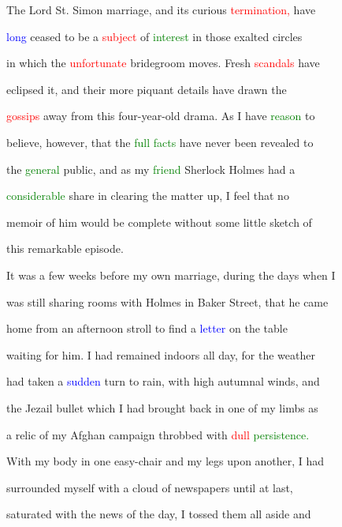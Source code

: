  The \textcolor{BurntOrange}{Lord} St. Simon \textcolor{BurntOrange}{marriage,} and its curious \textcolor{red}{termination,} have

 \textcolor{blue}{long} ceased to be a \textcolor{red}{subject} of \textcolor{green}{interest} in those \textcolor{BurntOrange}{exalted} circles

 in which the \textcolor{red}{unfortunate} \textcolor{BurntOrange}{bridegroom} moves. Fresh \textcolor{red}{scandals} have

 eclipsed it, and their more piquant details have drawn the

 \textcolor{red}{gossips} away from this four-year-old drama. As I have \textcolor{green}{reason} to

 believe, however, that the \textcolor{green}{full} \textcolor{green}{facts} have never been revealed to

 the \textcolor{green}{general} \textcolor{BurntOrange}{public,} and as my \textcolor{green}{friend} Sherlock Holmes had a

 \textcolor{green}{considerable} \textcolor{BurntOrange}{share} in clearing the matter up, I feel that no

 memoir of him would be complete without some little sketch of

 this \textcolor{BurntOrange}{remarkable} episode.



 It was a few weeks before my own \textcolor{BurntOrange}{marriage,} during the days when I

 was still \textcolor{BurntOrange}{sharing} rooms with Holmes in Baker Street, that he came

 home from an afternoon stroll to find a \textcolor{blue}{letter} on the table

 \textcolor{BurntOrange}{waiting} for him. I had remained indoors all day, for the weather

 had taken a \textcolor{blue}{sudden} turn to rain, with high autumnal winds, and

 the Jezail bullet which I had brought back in one of my limbs as

 a relic of my Afghan campaign throbbed with \textcolor{red}{dull} \textcolor{green}{persistence.}

 With my body in one easy-chair and my legs upon another, I had

 \textcolor{BurntOrange}{surrounded} myself with a cloud of newspapers until at last,

 saturated with the news of the day, I tossed them all aside and

